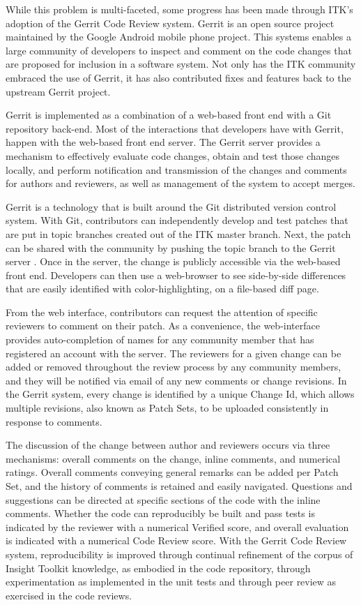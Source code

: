 \documentclass{frontiersENG} %
\begin{document}
While this problem is multi-faceted, some progress has been made through ITK’s
adoption of the Gerrit Code Review system.  Gerrit is an open source project
maintained by the Google Android mobile phone project. This systems enables a
large community of developers to inspect and comment on the code changes that
are proposed for inclusion in a software system. Not only has the ITK community
embraced the use of Gerrit, it has also contributed fixes and features back to
the upstream Gerrit project.

Gerrit is implemented as a combination of a web-based front end with a Git
repository back-end. Most of the interactions that developers have with Gerrit,
happen with the web-based front end server. The Gerrit server provides a
mechanism to effectively evaluate code changes, obtain and test those changes
locally, and perform notification and transmission of the changes and comments
for authors and reviewers, as well as management of the system to accept
merges.

Gerrit is a technology that is built around the Git distributed version control
system.  With Git, contributors can independently develop and test patches that
are put in topic branches created out of the ITK master branch.  Next, the
patch can be shared with the community by pushing the topic branch to the
Gerrit server \cite{ITKGerrit}.  Once in the server, the change is publicly
accessible via the web-based front end.  Developers can then use a web-browser
to see side-by-side differences that are easily identified with
color-highlighting, on a file-based diff page.

From the web interface, contributors can request the attention of specific
reviewers to comment on their patch. As a convenience, the web-interface
provides auto-completion of names for any community member that has registered
an account with the server.  The reviewers for a given change can be added or
removed throughout the review process by any community members, and they will
be notified via email of any new comments or change revisions.  In the Gerrit
system, every change is identified by a unique Change Id, which allows multiple
revisions, also known as Patch Sets, to be uploaded consistently in response to
comments.

The discussion of the change between author and reviewers occurs via three
mechanisms: overall comments on the change, inline comments, and numerical
ratings. Overall comments conveying general remarks can be added per Patch
Set, and the history of comments is retained and easily navigated. Questions
and suggestions can be directed at specific sections of the code with the
inline comments. Whether the code can reproducibly be built and pass tests is
indicated by the reviewer with a numerical Verified score, and overall
evaluation is indicated with a numerical Code Review score. With the Gerrit
Code Review system, reproducibility is improved through continual refinement of
the corpus of Insight Toolkit knowledge, as embodied in the code repository,
through experimentation as implemented in the unit tests and through peer
review as exercised in the code reviews.
\end{document}
